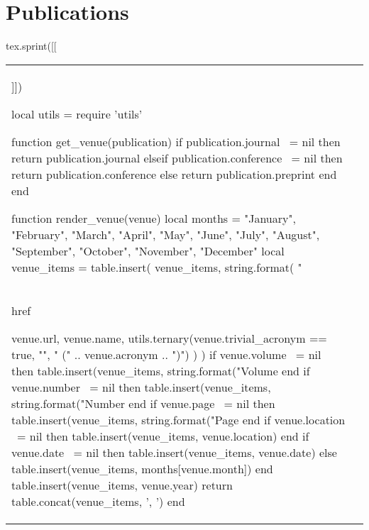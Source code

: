 \section{\sc Publications}

\begin{luacode*}
tex.sprint([[\begin{longtabu}{p{.095\resumewidth} p{.79\resumewidth}}]])

local utils = require 'utils'

function get_venue(publication)
    if publication.journal ~= nil then
        return publication.journal
    elseif publication.conference ~= nil then
        return publication.conference
    else
        return publication.preprint
    end
end

function render_venue(venue)
    local months = {"January", "February", "March", "April", "May", "June", "July", "August", "September", "October", "November", "December"}
    local venue_items = {}
    table.insert(
        venue_items,
        string.format(
            "\\href{%s}{\\textsf{%
            venue.url,
            venue.name,
            utils.ternary(venue.trivial_acronym == true, "", " (" .. venue.acronym .. ")")
        )
    )
    if venue.volume ~= nil then
        table.insert(venue_items, string.format("Volume %
    end
    if venue.number ~= nil then
        table.insert(venue_items, string.format("Number %
    end
    if venue.page ~= nil then
        table.insert(venue_items, string.format("Page %
    end
    if venue.location ~= nil then
        table.insert(venue_items, venue.location)
    end
    if venue.date ~= nil then
        table.insert(venue_items, venue.date)
    else
        table.insert(venue_items, months[venue.month])
    end
    table.insert(venue_items, venue.year)
    return table.concat(venue_items, ', ')
end

}
\end{longtabu}
\end{luacode*}
